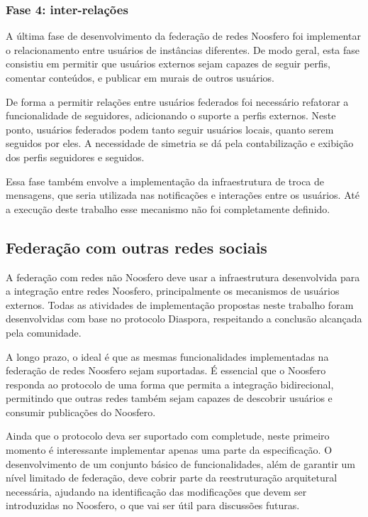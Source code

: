 \subsubsection{Fase 4: inter-relações}

A última fase de desenvolvimento da federação de redes Noosfero foi implementar o
relacionamento entre usuários de instâncias diferentes. De modo geral, esta fase
consistiu em permitir que usuários externos sejam capazes de seguir perfis, comentar
conteúdos, e publicar em murais de outros usuários.

De forma a permitir relações entre usuários federados foi necessário refatorar a
funcionalidade de seguidores, adicionando o suporte a perfis externos. Neste ponto,
usuários federados podem tanto seguir usuários locais, quanto serem seguidos por
eles. A necessidade de simetria se dá pela contabilização e exibição dos perfis
seguidores e seguidos.

Essa fase também envolve a implementação da infraestrutura de troca de mensagens,
que seria utilizada nas notificações e interações entre os usuários. Até a
execução deste trabalho esse mecanismo não foi completamente definido.


\subsection{Federação com outras redes sociais}
\label{subsec:federacao_externa}

A federação com redes não Noosfero deve usar a infraestrutura desenvolvida para a
integração entre redes Noosfero, principalmente os mecanismos de usuários externos.
Todas as atividades de implementação propostas neste trabalho foram desenvolvidas
com base no protocolo Diaspora, respeitando a conclusão alcançada pela comunidade.

A longo prazo, o ideal é que as mesmas funcionalidades implementadas na federação de
redes Noosfero sejam suportadas. É essencial que o Noosfero responda ao protocolo de
uma forma que permita a integração bidirecional, permitindo que outras redes
também sejam capazes de descobrir usuários e consumir publicações do Noosfero.

Ainda que o protocolo deva ser suportado com completude, neste primeiro momento é
interessante implementar apenas uma parte da especificação. O desenvolvimento de um
conjunto básico de funcionalidades, além de garantir um nível limitado de federação,
deve cobrir parte da reestruturação arquitetural necessária, ajudando na
identificação das modificações que devem ser introduzidas no Noosfero, o que vai ser
útil para discussões futuras.

